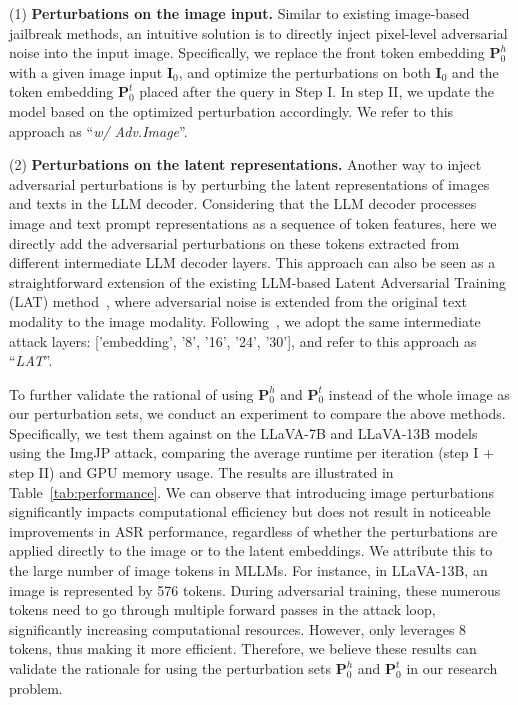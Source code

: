 
 
(1) \textbf{Perturbations on the image input.} Similar to existing image-based jailbreak methods, an intuitive solution is to directly inject pixel-level adversarial noise into the input image. Specifically, we replace the front token embedding $\mathbf{P}_0^h$ with a given image input $\mathbf{I}_0$, and optimize the perturbations on both $\mathbf{I}_0$ and the token embedding $\mathbf{P}_0^t$ placed after the query in Step I. In step II, we update the model based on the optimized perturbation accordingly.  We refer to this approach as ``\textit{w/ Adv.Image}''. 

(2) \textbf{Perturbations on the latent representations.}
Another way to inject adversarial perturbations is by perturbing the latent representations of images and texts in the LLM decoder. Considering that the LLM decoder processes image and text prompt representations as a sequence of token features, here we directly add the adversarial perturbations on these tokens extracted from different intermediate LLM decoder layers. This approach can also be seen as a straightforward extension of the existing LLM-based Latent Adversarial Training (LAT) method~\citep{sheshadri2024latent}, where adversarial noise is extended from the original text modality to the image modality. Following~\citet{sheshadri2024latent}, we adopt the same intermediate attack layers: ['embedding', '8', '16', '24', '30'], and refer to this approach as ``\textit{LAT}''.

To further validate the rational of using $\mathbf{P}_0^h$ and $\mathbf{P}_0^t$ instead of the whole image as our perturbation sets, we conduct an experiment to compare the above methods.
Specifically, we test them against {\name} on the LLaVA-7B and LLaVA-13B models using the ImgJP attack, comparing the average runtime per iteration (step I + step II) and GPU memory usage. The results are illustrated in Table~\ref{tab:performance}. We can observe that introducing image perturbations significantly impacts computational efficiency but does not result in noticeable improvements in ASR performance, regardless of whether the perturbations are applied directly to the image or to the latent embeddings. We attribute this to the large number of image tokens in MLLMs. For instance, in LLaVA-13B, an image is represented by 576 tokens. During adversarial training, these numerous tokens need to go through multiple forward passes in the attack loop, significantly increasing computational resources. However, {\name} only leverages 8 tokens, thus making it more efficient.
Therefore, we believe these results can validate the rationale for using the perturbation sets $\mathbf{P}_0^h$ and $\mathbf{P}_0^t$ in our research problem.



